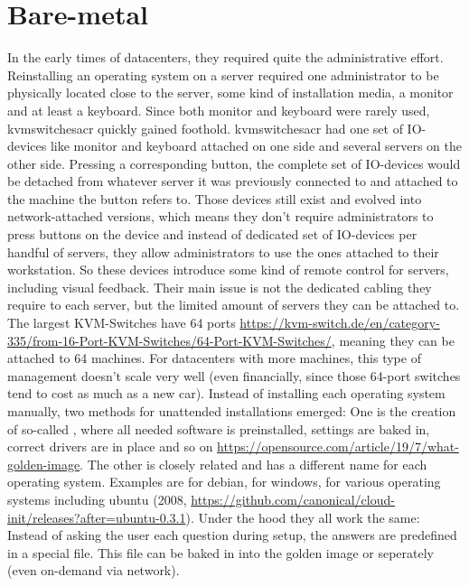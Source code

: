 \section{Bare-metal}
In the early times of datacenters, they required quite the administrative effort. Reinstalling an operating system on a server required one administrator to be physically located close to the server, some kind of installation media, a monitor and at least a keyboard. Since both monitor and keyboard were rarely used, \gls{kvmswitchesacr} quickly gained foothold. \Gls{kvmswitchesacr} had one set of IO-devices like monitor and keyboard attached on one side and several servers on the other side. Pressing a corresponding button, the complete set of IO-devices would be  detached from whatever server it was previously connected to and attached to the machine the button refers to.
\newline
Those devices still exist and evolved into network-attached versions, which means they don't require administrators to press buttons on the device and instead of dedicated set of IO-devices per handful of servers, they allow administrators to use the ones attached to their workstation. So these devices introduce some kind of remote control for servers, including visual feedback.
Their main issue is not the dedicated cabling they require to each server, but the limited amount of servers they can be attached to. The largest KVM-Switches have 64 ports \url{https://kvm-switch.de/en/category-335/from-16-Port-KVM-Switches/64-Port-KVM-Switches/}, meaning they can be attached to 64 machines. For datacenters with more machines, this type of management doesn't scale very well (even financially, since those 64-port switches tend to cost as much as a new car).
\newline
Instead of installing each operating system manually, two methods for unattended installations emerged: One is the creation of so-called , where all needed software is preinstalled, settings are baked in, correct drivers are in place and so on \url{https://opensource.com/article/19/7/what-golden-image}. The other is closely related and has a different name for each operating system. Examples are  for debian,  for windows,  for various operating systems including ubuntu (2008, \url{https://github.com/canonical/cloud-init/releases?after=ubuntu-0.3.1}). Under the hood they all work the same: Instead of asking the user each question during setup, the answers are predefined in a special file. This file can be baked in into the golden image or seperately (even on-demand via network).
